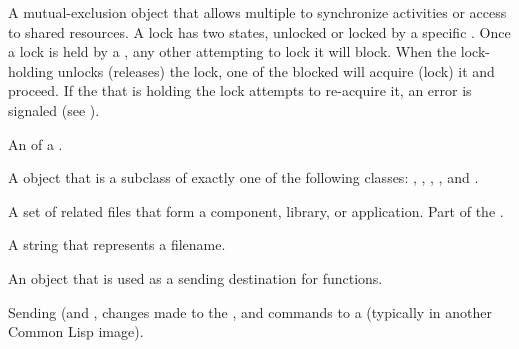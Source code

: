\begin{glossary-list}

\glent[lock] 
%
%
%
%
A mutual-exclusion object that allows multiple  to
synchronize activities or access to shared resources. A lock has two
states, unlocked or locked by a specific . Once a lock
is held by a , any other  attempting to
lock it will block. When the lock-holding  unlocks
(releases) the lock, one of the blocked  will acquire
(lock) it and proceed.  If the  that is holding the lock
attempts to re-acquire it, an error is signaled (see
).


\glent[metaobject]
%
%
An  of a .


%
%
%
A  object that is a subclass of exactly one of the following
classes: , , ,
, and .


\glent[module]
%
%
%
A set of related files that form a component, library, or application.
Part of the .


\glent[namestring]
%
%
A string that represents a filename.


%
%
%
%
An object that is used as a sending destination for
 functions.


%
%
%
%
Sending  (and , changes made to
the , and commands to a 
(typically in another Common Lisp image).


\end{glossary-list}
